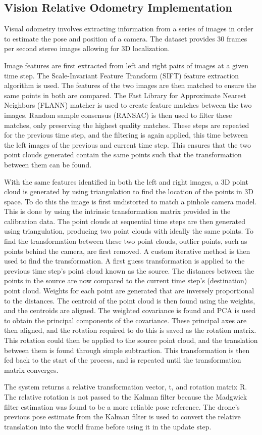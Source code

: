 \documentclass[bare_jrnl_transmag]{subfiles}
\begin{document}
\subsection{Vision Relative Odometry Implementation}

Visual odometry involves extracting information from a series of images in order to estimate the pose and position of a camera. The dataset provides 30 frames per second stereo images allowing for 3D localization. 

Image features are first extracted from left and right pairs of images at a given time step. The Scale-Invariant Feature Transform (SIFT) feature extraction algorithm is used. The features of the two images are then matched to ensure the same points in both are compared. The Fast Library for Approximate Nearest Neighbors (FLANN) matcher is used to create feature matches between the two images.  Random sample consensus (RANSAC) is then used to filter these matches, only preserving the highest quality matches.  These steps are repeated for the previous time step, and the filtering is again applied, this time between the left images of the previous and current time step. This ensures that the two point clouds generated contain the same points such that the transformation between them can be found.

With the same features identified in both the left and right images, a 3D point cloud is generated by using triangulation to find the location of the points in 3D space. To do this the image is first undistorted to match a pinhole camera model. This is done by using the intrinsic transformation matrix provided in the calibration data. The point clouds at sequential time steps are then generated using triangulation, producing two point clouds with ideally the same points. To find the transformation between these two point clouds, outlier points, such as points behind the camera, are first removed. A custom iterative method is then used to find the transformation. A first guess transformation is applied to the previous time step's point cloud known as the source. The distances between the points in the source are now compared to the current time step's (destination) point cloud. Weights for each point are generated that are inversely proportional to the distances. The centroid of the point cloud is then found using the weights, and the centroids are aligned. The weighted covariance is found and PCA is used to obtain the principal components of the covariance. These principal axes are then aligned, and the rotation required to do this is saved as the rotation matrix. This rotation could then be applied to the source point cloud, and the translation between them is found through simple subtraction. This transformation is then fed back to the start of the process, and is repeated until the transformation matrix converges.

The system returns a relative transformation vector, t, and rotation matrix R. The relative rotation is not passed to the Kalman filter because the Madgwick filter estimation was found to be a more reliable pose reference. The drone's previous pose estimate from the Kalman filter is used to convert the relative translation into the world frame before using it in the update step.
\end{document}
